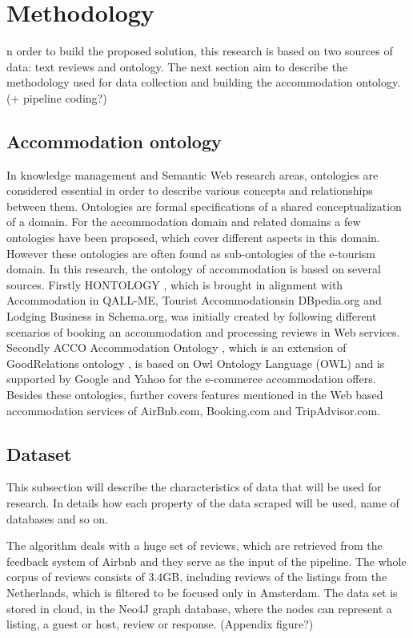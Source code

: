 %
%
\let\textcircled=\pgftextcircled
\chapter{Methodology}
\label{chap:methods}

n order to build the proposed solution, this research is based on two sources of data: text reviews and ontology. The next section aim to describe the methodology used for data collection and building the accommodation ontology. (+ pipeline coding?)

\section{Accommodation ontology} 
In knowledge management and Semantic Web research areas, ontologies are considered essential in order to describe various concepts and relationships between them. Ontologies are formal specifications of a shared conceptualization of a domain. For the accommodation domain and related domains a few ontologies have been proposed, which cover different aspects in this domain. However these ontologies are often found as sub-ontologies of the e-tourism domain. In this research, the ontology of accommodation is based on several sources. Firstly HONTOLOGY \cite{chaves2012hontology}, which is brought in alignment with Accommodation in QALL-ME, Tourist Accommodationsin DBpedia.org and Lodging Business  in Schema.org, was initially created by following different scenarios of booking an accommodation and processing reviews in Web services. Secondly ACCO Accommodation Ontology \cite{hepp2013accommodation}, which is an extension of GoodRelations ontology \cite{hepp2008goodrelations}, is based on Owl Ontology Language (OWL) and is supported by Google and Yahoo for the e-commerce accommodation offers.
Besides these ontologies,  further covers features mentioned in the Web based accommodation services of AirBnb.com, Booking.com and TripAdvisor.com.


\section{Dataset}
This subsection will describe the characteristics of data that will be used for research. In details how each property of the data scraped will be used, name of databases and so on.

The algorithm deals with a huge set of reviews, which are retrieved from the feedback system of Airbnb and they serve as the input of the pipeline. The whole corpus of reviews consists of 3.4GB, including reviews of the listings from the Netherlands, which is filtered to be focused only in Amsterdam. The data set is stored in cloud, in the Neo4J graph database, where the nodes can represent a listing, a guest or host, review or response. (Appendix figure?)
